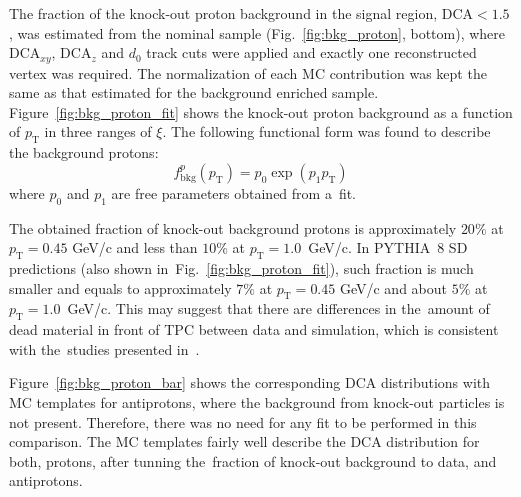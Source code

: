 The fraction of the knock-out proton background in the signal region, $\textrm{DCA}<1.5$, was estimated from the nominal sample (Fig.~\ref{fig:bkg_proton}, bottom), where $\textrm{DCA}_{xy}$, $\textrm{DCA}_z$ and $d_0$ track cuts were applied and exactly one reconstructed vertex was required. The normalization of each MC contribution was kept the same as that estimated for the background enriched sample. Figure~\ref{fig:bkg_proton_fit} shows the knock-out proton background as a function of $p_\textrm{T}$ in three ranges of $\xi$. The following functional form was found to describe the
background protons:
\begin{equation}
f_{\textrm{bkg}}^{p}\left(p_\textrm{T}\right) = p_0\exp\left(p_1p_\textrm{T}\right)
\label{eq:protonBkgParametrization}
\end{equation}
where  $p_0$ and $p_1$ are  free parameters obtained from a~fit. 

The obtained fraction of knock-out background protons is approximately $20\%$ at $p_\textrm{T} = 0.45$ GeV/c
 and less than $10\%$ at $p_\textrm{T} = 1.0$~GeV/c.
 In PYTHIA~8 SD   predictions (also shown in~Fig.~\ref{fig:bkg_proton_fit}), such fraction is much smaller  and equals to approximately $7\%$ at $p_\textrm{T} = 0.45$ GeV/c
 and about $5\%$ at $p_\textrm{T} = 1.0$~GeV/c. This may suggest that there are differences in the~amount of dead material in front of TPC  between data and simulation, which is consistent with the~studies presented in~\cite{supplementaryNote}.
 
 
 Figure~\ref{fig:bkg_proton_bar} shows the corresponding $\textrm{DCA}$ distributions with MC templates for antiprotons, where the background from knock-out particles is not present. Therefore, there was no need for any fit to be performed in this comparison. The MC templates  fairly well describe the $\textrm{DCA}$ distribution for both, protons, after tunning the~fraction of knock-out background to data, and antiprotons. %
 

